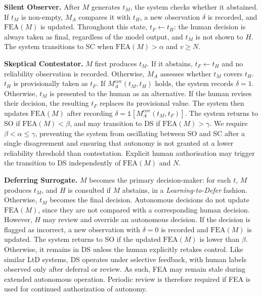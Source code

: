 \documentclass[a4paper,twoside]{article}
\begin{document}
\textbf{Silent Observer.}
After $M$ generates $t_M$, the system checks whether it abstained. If $t_M$ is non-empty, $M_A$ compares it with $t_H$, a new observation $\delta$ is recorded, and $\mathrm{FEA}(M)$ is updated.
Throughout this state, $t_F\gets t_H$: the human decision is always taken as final, regardless of the model output, and $t_M$ is not shown to $H$. The system transitions to SC when $\mathrm{FEA}(M)>\alpha$ and $v\geq N$.

\textbf{Skeptical Contestator.}
$M$ first produces $t_M$. If it abstains, $t_F\gets t_H$ and no reliability observation is recorded. Otherwise, $M_A$ assesses whether $t_M$ covers $t_H$. $t_H$ is provisionally taken as $t_F$. If $M_A^{\mathrm{cov}}(t_M,t_H)$ holds, the system records $\delta=1$. Otherwise, $t_M$ is presented to the human as an alternative. If the human revises their decision, the resulting $t_F$ replaces its provisional value. The system then updates $\mathrm{FEA}(M)$ after recording $\delta=\mathbb{1}\left[M_A^{\mathrm{cov}}(t_M,t_F)\right]$. The system returns to SO if $\mathrm{FEA}(M)<\beta$, and may transition to DS if $\mathrm{FEA}(M)>\gamma$. We require $\beta<\alpha\leq\gamma$, preventing the system from oscillating between SO and SC after a single disagreement and ensuring that autonomy is not granted at a lower reliability threshold than contestation. Explicit human authorisation may trigger the transition to DS independently of $\mathrm{FEA}(M)$ and $N$.

\textbf{Deferring Surrogate.}
$M$ becomes the primary decision-maker: for each $t$, $M$ produces $t_M$, and $H$ is consulted if $M$ abstains, in a \textit{Learning-to-Defer} fashion. Otherwise, $t_M$ becomes the final decision. Autonomous decisions do not update $\mathrm{FEA}(M)$, since they are not compared with a corresponding human decision. However, $H$ may review and override an autonomous decision. If the decision is flagged as incorrect, a new observation with $\delta=0$ is recorded and $\mathrm{FEA}(M)$ is updated. The system returns to SO if the updated $\mathrm{FEA}(M)$ is lower than $\beta$. Otherwise, it remains in DS unless the human explicitly retakes control. Like similar LtD systems, DS operates under selective feedback, with human labels observed only after deferral or review. As such, FEA may remain stale during extended autonomous operation. Periodic review is therefore required if FEA is used for continued authorization of autonomy.
\end{document}
